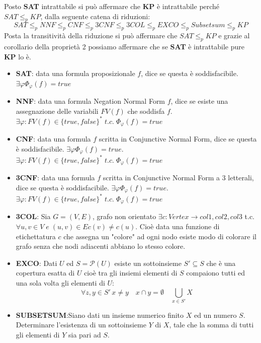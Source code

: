 \documentclass[a4paper]{article}
\newcommand{\red}{\leq_p}
\begin{document}
Posto \textbf{SAT} intrattabile si può affermare che \textbf{KP} è intrattabile perché $SAT \red KP$, dalla seguente catena di riduzioni:
$$ SAT \red NNF \red CNF \red 3CNF \red 3COL \red EXCO \red Subsetsum \red KP$$
Posta la transitività della riduzione si può affermare che $SAT \red KP$ e grazie al corollario della proprietà 2 possiamo affermare che se \textbf{SAT} è intrattabile pure \textbf{KP} lo è.
\begin{itemize}
	\item \textbf{SAT}: data una formula proposizionale $f$, dice se questa è soddisfacibile. $\exists \varphi \Phi _ {\varphi}(f) = true $
	\item \textbf{NNF}: data una formula Negation Normal Form $f$, dice se esiste una assegnazione delle variabili $FV(f)$ che soddisfa $f$.\\$\exists \varphi:FV(f) \in \{true,false\}^* \; t.c. \; \Phi _ {\varphi}(f) = true $
	\item \textbf{CNF}: data una formula $f$ scritta in Conjunctive Normal Form, dice se questa è soddisfacibile. $\exists \varphi \Phi _ {\varphi}(f) = true $.\\
$\exists \varphi:FV(f) \in \{true,false\}^* \; t.c. \; \Phi _ {\varphi}(f) = true $
	\item \textbf{3CNF}: data una formula $f$ scritta in Conjunctive Normal Form a 3 letterali, dice se questa è soddisfacibile. $\exists \varphi \Phi _ {\varphi}(f) = true $.\\
$\exists \varphi:FV(f) \in \{true,false\}^* \; t.c. \; \Phi _ {\varphi}(f) = true $
	\item \textbf{3COL}: Sia $G = (V,E)$, grafo non orientato $\exists c : Vertex \rightarrow {col1,col2,col3}$ t.c. $\forall u,v \in V \; e \; (u,v) \in E c(v) \neq c(u)$.
		Cioè data una funzione di etichettatura $c$ che assegna un "colore" ad ogni nodo esiste modo di colorare il grafo senza che nodi adiacenti abbiano lo stesso colore.
	\item \textbf{EXCO}: Dati $U$ ed $S=\mathcal{P}(U)$ esiste un sottoinsieme $S' \subseteq S$ che è una copertura esatta di $U$ cioè tra gli insiemi elementi di $S$ compaiono tutti ed una sola volta gli elementi di $U$:
		$$\forall z,y \in S'\, x \neq y \quad x \cap y = \emptyset \quad \bigcup_{x \in S'}X $$
	\item \textbf{SUBSETSUM}:Siano dati un insieme numerico finito $X$ ed un numero $S$. Determinare l’esistenza di un sottoinsieme $Y$ di $X$, tale che la somma di tutti gli elementi di $Y$ sia pari ad $S$. 
\end{itemize}
\end{document}
